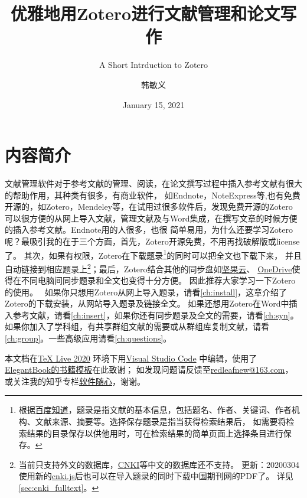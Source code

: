 \documentclass[cn,11pt,chinese]{elegantbook}
\title{优雅地用Zotero进行文献管理和论文写作}
\subtitle{A Short Intrduction to Zotero}
\author{韩敏义}
\institute{南京农业大学\\\kaishu\hspace{1.1cm}温氏食品集团股份有限公司}
\date{January 15, 2021}
\begin{document}
 
\maketitle
\frontmatter

  \chapter*{内容简介}
	
		文献管理软件对于参考文献的管理、阅读，在论文撰写过程中插入参考文献有很大的帮助作用，其种类有很多，有商业软件，
		如Endnote，NoteExpress等,也有免费开源的，如Zotero，Mendeley等，在试用过很多软件后，发现免费开源的Zotero
		可以很方便的从网上导入文献，管理文献及与Word集成，在撰写文章的时候方便的插入参考文献。Endnote用的人很多，也很
		简单易用，为什么还要学习Zotero呢？最吸引我的在于三个方面，首先，Zotero开源免费，不用再找破解版或license了。
		其次，如果有权限，Zotero在下载题录\footnote{根据\href{https://zhidao.baidu.com/question/443193991.html}
		{百度知道}，题录是指文献的基本信息，包括题名、作者、关键词、作者机构、文献来源、摘要等。选择保存题录是指当获得检索结果后，
		如需要将检索结果的目录保存以供他用时，可在检索结果的简单页面上选择条目进行保存。}的同时可以把全文也下载下来，
		并且自动链接到相应题录上\footnote{当前只支持外文的数据库，\href{http://www.cnki.net}{CNKI}等中文的数据库还不支持。
		更新：20200304 使用新的\href{https://github.com/Zotero-CN/translators_CN}{cnki.js}后也可以在导入题录的同时下载中国期刊网的PDF了。
		详见\cref{sec:cnki_fulltext}。}；最后，Zotero结合其他的同步盘如\href{https://www.jianguoyun.com}{坚果云}、
		\href{https://office.live.com/start/OneDrive.aspx}{OneDrive}使得在不同电脑间同步题录和全文也变得十分方便。
		因此推荐大家学习一下Zotero的使用。
		\
		如果你只想用Zotero从网上导入题录，请看\cref{ch:install}，这章介绍了Zotero的下载安装，从网站导入题录及链接全文。
		如果还想用Zotero在Word中插入参考文献，请看\cref{ch:insert}，如果你还有同步题录及全文的需要，请看\cref{ch:syn}。
		如果你加入了学科组，有共享群组文献的需要或从群组库复制文献，请看\cref{ch:group}。一些高级应用请看\cref{ch:questions}。
		
		
		本文档在\href{http://tug.org/texlive/}{\TeX{} Live 2020} 环境下用\href{https://code.visualstudio.com/}{Visual Studio Code}
		中编辑，使用了\href{https://elegantlatex.org/}{ElegantBook的书籍模板}在此致谢；
		如发现问题请反馈至\href{mailto:redleafnew@163.com}{redleafnew@163.com}，
		或关注我的知乎专栏\href{https://zhuanlan.zhihu.com/c_1071081428967743488}{软件随心}，谢谢。

\tableofcontents
\end{document}
